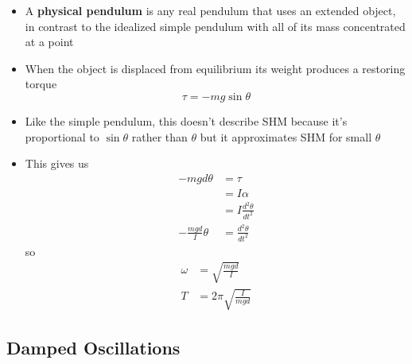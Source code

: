 \documentclass{article}
\begin{document}
\begin{itemize}
  \item A \textbf{physical pendulum} is any real pendulum that uses an extended object, in contrast to the idealized simple pendulum with all of its mass concentrated at a point

  \item When the object is displaced from equilibrium its weight produces a restoring torque \[\tau = -mg\sin\theta\]

  \item Like the simple pendulum, this doesn't describe SHM because it's proportional to $\sin\theta$ rather than $\theta$ but it approximates SHM for small $\theta$

  \item This gives us
        \begin{align*}
          -mgd\theta           & = \tau                     \\
                               & = I\alpha                  \\
                               & = I\frac{d^2 \theta}{dt^2} \\
          -\frac{mgd}{I}\theta & = \frac{d^2 \theta}{dt^2}
        \end{align*}
        so
        \begin{align*}
          \omega & = \sqrt{\frac{mgd}{I}}      \\
          T      & = 2\pi \sqrt{\frac{I}{mgd}}
        \end{align*}
\end{itemize}

\subsection{Damped Oscillations}
\end{document}

